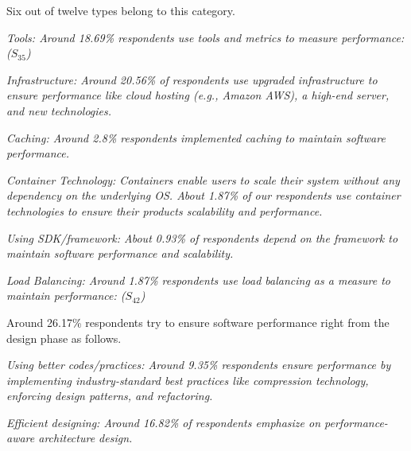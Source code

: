\begin{inparaenum}[(1)]
\item {} Six out of twelve types belong to this category.
\begin{inparaenum}%
    \item \it{Tools}: Around 18.69\% respondents use tools and metrics to
    measure performance:  ($S_{35}$)
    \item \it{Infrastructure}: Around 20.56\% of respondents use upgraded
    infrastructure to ensure performance like cloud
    hosting (e.g., Amazon AWS), a high-end server, and new technologies.
    \item \it{Caching}: Around 2.8\% respondents implemented caching to maintain
    software performance.
    \item \it{Container Technology}: Containers enable users to scale their system without any dependency on the underlying OS. About 1.87\% of our respondents use container technologies to ensure their products scalability and performance.
    \item \it{Using SDK/framework}: About 0.93\% of respondents depend on the framework to maintain software performance and scalability.
    \item \it{Load Balancing}: Around 1.87\% respondents use load
    balancing as a measure to maintain performance:
    ($S_{42}$)
\end{inparaenum}
 
\item {}  Around 26.17\% respondents try to ensure software performance right from the design phase as follows.
\begin{inparaenum}%
    \item \it{Using better codes/practices}: Around 9.35\% respondents ensure performance by
    implementing industry-standard best practices like compression
    technology, enforcing design patterns, and refactoring.
    \item \it{Efficient designing}: Around 16.82\% of respondents emphasize on
    performance-aware architecture design.
\end{inparaenum}


\end{inparaenum}
